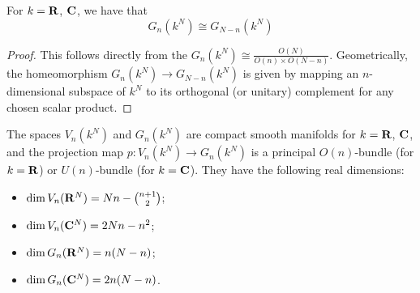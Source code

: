 \documentclass[a4paper,openany]{scrbook}
\begin{document}
\begin{corollary}
For $k=\mathbf R$, $\mathbf C$, we have that
\[
G_n(k^N) \cong G_{N-n}(k^N)
\]
\end{corollary}
\begin{proof}
This follows directly from the $G_n(k^N) \cong \frac{O(N)}{O(n) \times O(N-n)}$. Geometrically, the homeomorphism $G_n(k^N) \to G_{N-n}(k^N)$ is given by mapping an $n$-dimensional subspace of $k^N$ to its orthogonal (or unitary) complement for any chosen scalar product.
\end{proof}



\begin{corollary} \label{cor:stiefelgrassmannbundle}\label{thm:grassmannianmanifolds}
The spaces $V_n(k^N)$ and $G_n(k^N)$ are compact smooth manifolds for $k=\mathbf R$, $\mathbf C$, and the projection map $p\colon V_n(k^N) \to G_n(k^N)$ is a principal $O(n)$-bundle (for $k=\mathbf R$) or $U(n)$-bundle (for $k=\mathbf C$). They have the following real dimensions:
\begin{itemize}
\item $\dim V_n(\mathbf R^N) = Nn - {n+1 \choose 2}$;
\item $\dim V_n(\mathbf C^N) = 2Nn - n^2$;
\item $\dim G_n(\mathbf R^N) = n(N-n)$;
\item $\dim G_n(\mathbf C^N) = 2n(N-n)$.
\end{itemize}
\end{corollary}
\end{document}
